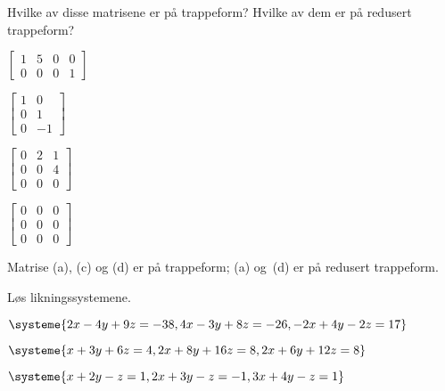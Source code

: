 
\begin{oppgave}
Hvilke av disse matrisene er på trappeform?  Hvilke av dem er på
redusert trappeform?
\begin{punkt}
$
\begin{bmatrix}
1 & 5 & 0 & 0 \\
0 & 0 & 0 & 1
\end{bmatrix}
$
\end{punkt}
\begin{punkt}
$
\begin{bmatrix}
1 & 0 \\
0 & 1 \\
0 & -1
\end{bmatrix}
$
\end{punkt}
\begin{punkt}
$
\begin{bmatrix}
0 & 2 & 1 \\
0 & 0 & 4 \\
0 & 0 & 0
\end{bmatrix}
$
\end{punkt}
\begin{punkt}
$
\begin{bmatrix}
0 & 0 & 0 \\
0 & 0 & 0 \\
0 & 0 & 0
\end{bmatrix}
$
\end{punkt}
\end{oppgave}
\begin{losning}
Matrise (a), (c) og (d) er på trappeform;
(a) og~(d) er på redusert trappeform.
\end{losning}

\begin{oppgave}
Løs likningssystemene.
\begin{punkt}
$
\systeme{
  2x - 4y + 9z = -38,
  4x - 3y + 8z = -26,
 -2x + 4y - 2z =  17
}
$
\end{punkt}
\begin{punkt}
$
\systeme{
  x + 3y +  6z = 4,
 2x + 8y + 16z = 8,
 2x + 6y + 12z = 8
}
$
\end{punkt}
\begin{punkt}
$
\systeme{
	x  + 2y - z = 1,
	2x + 3y - z = -1,
	3x + 4y - z = 1
}
$
\end{punkt}
\end{oppgave}

